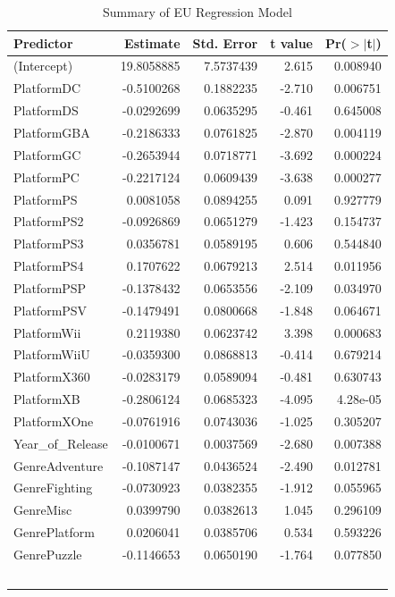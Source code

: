 \documentclass[12pt]{article}
\begin{document}
\begin{table}[ht]
  \caption{Summary of EU Regression Model}
  \label{tab:EU}
\centering
\begin{tabular}{lrrrr}
\hline
Predictor & Estimate & Std. Error & t value & Pr($>$$|$t$|$) \\ 
\hline
(Intercept) & 19.8058885 & 7.5737439 & 2.615 & 0.008940 \\
PlatformDC & -0.5100268 & 0.1882235 & -2.710 & 0.006751 \\
PlatformDS & -0.0292699 & 0.0635295 & -0.461 & 0.645008 \\
PlatformGBA & -0.2186333 & 0.0761825 & -2.870 & 0.004119 \\
PlatformGC & -0.2653944 & 0.0718771 & -3.692 & 0.000224 \\
PlatformPC & -0.2217124 & 0.0609439 & -3.638 & 0.000277 \\
PlatformPS & 0.0081058 & 0.0894255 & 0.091 & 0.927779 \\
PlatformPS2 & -0.0926869 & 0.0651279 & -1.423 & 0.154737 \\
PlatformPS3 & 0.0356781 & 0.0589195 & 0.606 & 0.544840 \\
PlatformPS4 & 0.1707622 & 0.0679213 & 2.514 & 0.011956 \\
PlatformPSP & -0.1378432 & 0.0653556 & -2.109 & 0.034970 \\
PlatformPSV & -0.1479491 & 0.0800668 & -1.848 & 0.064671 \\
PlatformWii & 0.2119380 & 0.0623742 & 3.398 & 0.000683 \\
PlatformWiiU & -0.0359300 & 0.0868813 & -0.414 & 0.679214 \\
PlatformX360 & -0.0283179 & 0.0589094 & -0.481 & 0.630743 \\
PlatformXB & -0.2806124 & 0.0685323 & -4.095 & 4.28e-05 \\
PlatformXOne & -0.0761916 & 0.0743036 & -1.025 & 0.305207 \\
Year_of_Release & -0.0100671 & 0.0037569 & -2.680 & 0.007388 \\
GenreAdventure & -0.1087147 & 0.0436524 & -2.490 & 0.012781 \\
GenreFighting & -0.0730923 & 0.0382355 & -1.912 & 0.055965 \\
GenreMisc & 0.0399790 & 0.0382613 & 1.045 & 0.296109 \\
GenrePlatform & 0.0206041 & 0.0385706 & 0.534 & 0.593226 \\
GenrePuzzle & -0.1146653 & 0.0650190 & -1.764 & 0.077850 \\
$$
\end{tabular}
\end{table}
\end{document}
